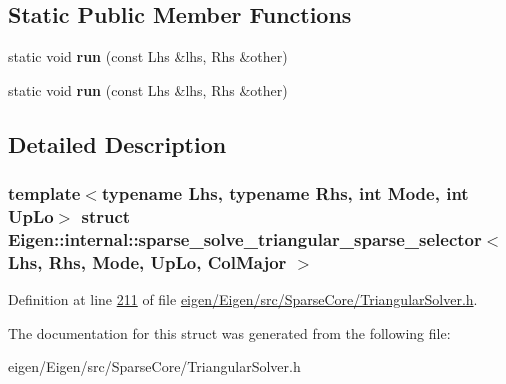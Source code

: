 \subsection*{Static Public Member Functions}
\begin{DoxyCompactItemize}
\item 
\mbox{\label{struct_eigen_1_1internal_1_1sparse__solve__triangular__sparse__selector_3_01_lhs_00_01_rhs_00_0103d70089ab1c1a5e4529163773532981_afaf80269f4b56b9a0b974fc2826a73cc}} 
static void {\bfseries run} (const Lhs \&lhs, Rhs \&other)
\item 
\mbox{\label{struct_eigen_1_1internal_1_1sparse__solve__triangular__sparse__selector_3_01_lhs_00_01_rhs_00_0103d70089ab1c1a5e4529163773532981_afaf80269f4b56b9a0b974fc2826a73cc}} 
static void {\bfseries run} (const Lhs \&lhs, Rhs \&other)
\end{DoxyCompactItemize}


\subsection{Detailed Description}
\subsubsection*{template$<$typename Lhs, typename Rhs, int Mode, int Up\+Lo$>$\newline
struct Eigen\+::internal\+::sparse\+\_\+solve\+\_\+triangular\+\_\+sparse\+\_\+selector$<$ Lhs, Rhs, Mode, Up\+Lo, Col\+Major $>$}



Definition at line \hyperlink{eigen_2_eigen_2src_2_sparse_core_2_triangular_solver_8h_source_l00211}{211} of file \hyperlink{eigen_2_eigen_2src_2_sparse_core_2_triangular_solver_8h_source}{eigen/\+Eigen/src/\+Sparse\+Core/\+Triangular\+Solver.\+h}.



The documentation for this struct was generated from the following file\+:\begin{DoxyCompactItemize}
\item 
eigen/\+Eigen/src/\+Sparse\+Core/\+Triangular\+Solver.\+h\end{DoxyCompactItemize}
